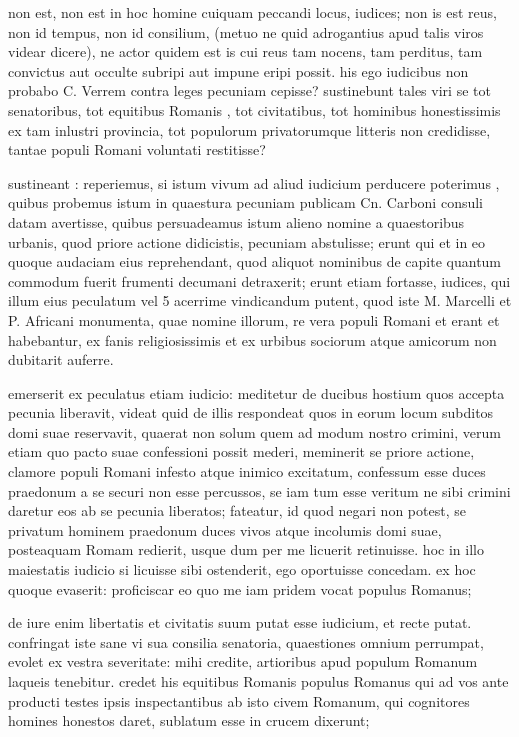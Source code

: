  non est, non est in hoc homine cuiquam peccandi locus, iudices; non is est reus, non id tempus, non id consilium, (metuo ne quid adrogantius apud talis viros videar dicere), ne actor quidem est is cui reus tam nocens, tam perditus, tam convictus aut occulte subripi aut impune eripi possit. his ego iudicibus non probabo C. Verrem contra leges pecuniam cepisse? sustinebunt tales viri se tot senatoribus, tot equitibus Romanis , tot civitatibus, tot hominibus honestissimis ex tam inlustri provincia, tot populorum privatorumque litteris non credidisse, tantae populi Romani voluntati restitisse?

 sustineant : reperiemus, si istum vivum ad aliud iudicium perducere poterimus , quibus probemus istum in quaestura pecuniam publicam Cn. Carboni consuli datam avertisse, quibus persuadeamus istum alieno nomine a quaestoribus urbanis, quod priore actione didicistis, pecuniam abstulisse; erunt qui et in eo quoque audaciam eius reprehendant, quod aliquot nominibus de capite quantum commodum fuerit frumenti decumani detraxerit; erunt etiam fortasse, iudices, qui illum eius peculatum vel 5 acerrime vindicandum putent, quod iste M. Marcelli et P. Africani monumenta, quae nomine illorum, re vera populi Romani et erant et habebantur, ex fanis religiosissimis et ex urbibus sociorum atque amicorum non dubitarit auferre.

 emerserit ex peculatus etiam iudicio: meditetur de ducibus hostium quos accepta pecunia liberavit, videat quid de illis respondeat quos in eorum locum subditos domi suae reservavit, quaerat non solum quem ad modum nostro crimini, verum etiam quo pacto suae confessioni possit mederi, meminerit se priore actione, clamore populi Romani infesto atque inimico excitatum, confessum esse duces praedonum a se securi non esse percussos, se iam tum esse veritum ne sibi crimini daretur eos ab se pecunia liberatos; fateatur, id quod negari non potest, se privatum hominem praedonum duces vivos atque incolumis domi suae, posteaquam Romam redierit, usque dum per me licuerit retinuisse. hoc in illo maiestatis iudicio si licuisse sibi ostenderit, ego oportuisse concedam. ex hoc quoque evaserit: proficiscar eo quo me iam pridem vocat populus Romanus;

 de iure enim libertatis et civitatis suum putat esse iudicium, et recte putat. confringat iste sane vi sua consilia senatoria, quaestiones omnium perrumpat, evolet ex vestra severitate: mihi credite, artioribus apud populum Romanum laqueis tenebitur. credet his equitibus Romanis populus Romanus qui ad vos ante producti testes ipsis inspectantibus ab isto civem Romanum, qui cognitores homines honestos daret, sublatum esse in crucem dixerunt;

